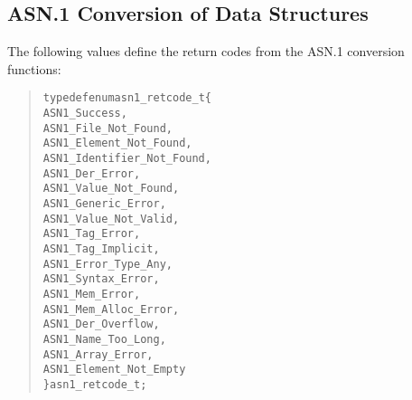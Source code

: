 \documentclass[a4paper]{article}
\newenvironment{code}%
{\begin{quote}\footnotesize\begin{alltt}}%
{\end{alltt}\end{quote}}%
\newenvironment{api}%
{\noindent$\bullet$\hfill\begin{minipage}[t]{0.97\linewidth}\footnotesize\begin{alltt}}%
{\end{alltt}\end{minipage}}%
\begin{document}

\subsection{ASN.1 Conversion of Data Structures}
The following values define the return codes from the ASN.1 conversion functions:
\begin{code}
typedef enum asn1_retcode_t \{
    ASN1_Success,
    ASN1_File_Not_Found,
    ASN1_Element_Not_Found,
    ASN1_Identifier_Not_Found,
    ASN1_Der_Error,
    ASN1_Value_Not_Found,
    ASN1_Generic_Error,
    ASN1_Value_Not_Valid,
    ASN1_Tag_Error,
    ASN1_Tag_Implicit,
    ASN1_Error_Type_Any,
    ASN1_Syntax_Error,
    ASN1_Mem_Error,
    ASN1_Mem_Alloc_Error,
    ASN1_Der_Overflow,
    ASN1_Name_Too_Long,
    ASN1_Array_Error,
    ASN1_Element_Not_Empty
\} asn1_retcode_t;
\end{code}
\end{document}
